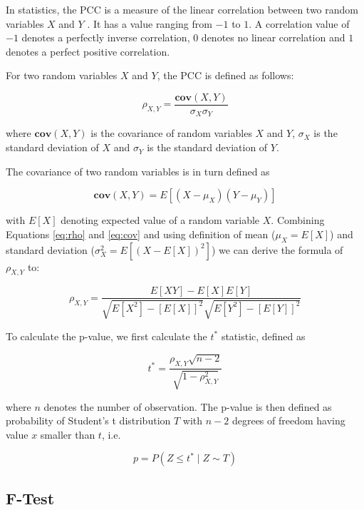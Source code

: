 \documentclass[pdftex,12pt,a4paper]{report}
\begin{document}
In statistics, the PCC is a measure of the linear correlation between two random variables $X$ and $Y$ \cite{fahrmeir2016statistik}. It has a value ranging from $-1$ to $1$. A correlation value of $-1$ denotes a perfectly inverse correlation, 0 denotes no linear correlation and $1$ denotes a perfect positive correlation.

For two random variables $X$ and $Y$, the PCC is defined as follows:

\begin{equation}
\rho_{X, Y} = \frac{\mathbf{cov}(X, Y)}{\sigma_X \sigma_Y}
\label{eq:rho}
\end{equation}

where $\mathbf{cov}(X, Y)$ is the covariance of random variables $X$  and $Y$, $\sigma_X$ is the standard deviation of $X$ and $\sigma_Y$ is the standard deviation of $Y$.

The covariance of two random variables is in turn defined as

\begin{equation}
\mathbf{cov}(X, Y) = E[(X - \mu_X)(Y - \mu_Y)]
\label{eq:cov}
\end{equation}

with $E[X]$ denoting expected value of a random variable $X$. Combining Equations \ref{eq:rho} and \ref{eq:cov} and using definition of mean ($\mu_X = E[X]$) and standard deviation ($\sigma^2_X = E[(X - E[X])^2]$) we can derive the formula of $\rho_{X,Y}$ to:

\begin{equation}
\rho_{X, Y} = \frac{E[XY] - E[X]E[Y]}{\sqrt{E[X^2] - [E[X]]^2} \sqrt{E[Y^2] - [E[Y]]^2}}
\label{eq:rho_cov}
\end{equation}

To calculate  the p-value, we  first calculate the $t^*$ statistic, defined  as

\begin{equation}
t^* = \frac{\rho_{X,Y} \sqrt{n - 2}}{\sqrt{1 - \rho_{X,Y}^2}}
\end{equation}

where $n$ denotes the number of observation. The p-value is then defined as probability of Student's t distribution $T$ with $n - 2$ degrees of freedom having value $x$ smaller than $t$, i.e.

\begin{equation}
p = P(Z \leq t^* \mid Z \sim T)
\end{equation}

\subsection{F-Test}
\end{document}
